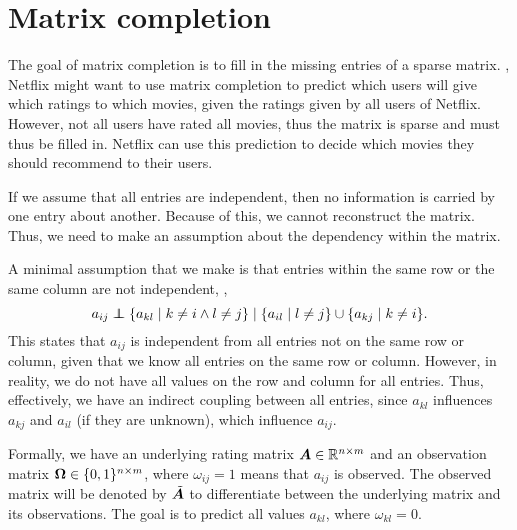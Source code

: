 \section{Matrix completion}

The goal of matrix completion is to fill in the missing entries of a sparse matrix. \Eg, Netflix
might want to use matrix completion to predict which users will give which ratings to which movies,
given the ratings given by all users of Netflix. However, not all users have rated all movies, thus
the matrix is sparse and must thus be filled in. Netflix can use this prediction to decide which
movies they should recommend to their users.

If we assume that all entries are independent, then no information is carried by one entry about
another. Because of this, we cannot reconstruct the matrix. Thus, we need to make an assumption
about the dependency within the matrix.

\begin{important}
    A minimal assumption that we make is that entries
    within the same row or the same column are not independent, \ie, \[
        a_{ij} \mathrel{\perp\!\!\!\!\perp} \{ a_{kl} \mid k \neq i \land l \neq j \} \mid \{ a_{il} \mid l \neq j \} \cup \{ a_{kj} \mid k \neq i \}.
    \]
    This states that $a_{ij}$ is independent from all entries not on the same row or column, given that
    we know all entries on the same row or column. However, in reality, we do not have all values on
    the row and column for all entries. Thus, effectively, we have an indirect coupling between all
    entries, since $a_{kl}$ influences $a_{kj}$ and $a_{il}$ (if they are unknown), which influence
    $a_{ij}$.
\end{important}

Formally, we have an underlying rating matrix $\bm{A} \in \mathbb{R}^{n \times m}$ and an observation
matrix $\bm{\Omega} \in \{ 0,1 \}^{n\times m}$, where $\omega_{ij}=1$ means that $a_{ij}$ is
observed. The observed matrix will be denoted by $\tilde{\bm{A}}$ to differentiate between the
underlying matrix and its observations. The goal is to predict all values $a_{kl}$, where
$\omega_{kl}=0$.


